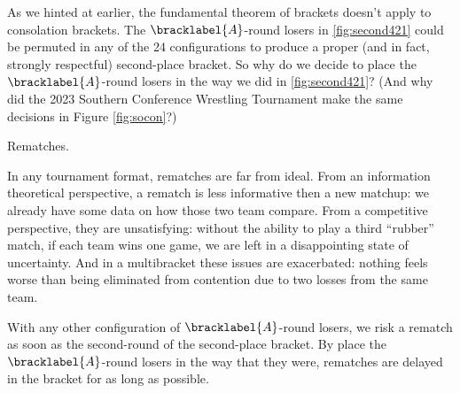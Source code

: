 {    As we hinted at earlier, the fundamental theorem of brackets doesn't apply to consolation brackets. The $\bracklabel{A}$-round losers in \ref{fig:second421} could be permuted in any of the 24 configurations to produce a proper (and in fact, strongly respectful) second-place bracket. So why do we decide to place the $\bracklabel{A}$-round losers in the way we did in \ref{fig:second421}? (And why did the 2023 Southern Conference Wrestling Tournament make the same decisions in Figure \ref{fig:socon}?)
    
    Rematches.

    In any tournament format, rematches are far from ideal. From an information theoretical perspective, a rematch is less informative then a new matchup: we already have some data on how those two team compare. From a competitive perspective, they are unsatisfying: without the ability to play a third ``rubber'' match, if each team wins one game, we are left in a disappointing state of uncertainty. And in a multibracket these issues are exacerbated: nothing feels worse than being eliminated from contention due to two losses from the same team.

    With any other configuration of $\bracklabel{A}$-round losers, we risk a rematch as soon as the second-round of the second-place bracket. By place the $\bracklabel{A}$-round losers in the way that they were, rematches are delayed in the bracket for as long as possible.    


}